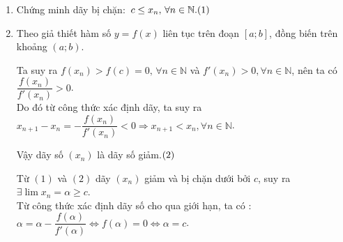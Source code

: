 \begin{enumerate}[1)]
\item Chứng minh dãy bị chặn$\colon$ $c\le x_n,\, \forall n\in\mathbb{N}.\hfill (1)$
\item Theo giả thiết hàm số $y=f(x)$ liên tục trên đoạn $[a;b]$, đồng biến trên khoảng $(a;b)$.

Ta suy ra $f(x_n) >f(c) =0,\, \forall n\in \mathbb{N}$ và $f'(x_n) >0, \forall n\in\mathbb{N}$, nên ta có $\dfrac{f(x_n)}{f'(x_n)}>0$.\\
Do đó từ công thức xác định dãy, ta suy ra $x_{n+1}-x_n =-\dfrac{f(x_n)}{f'(x_n)}<0\Rightarrow x_{n+1}<x_n,\forall n\in\mathbb{N}$.

Vậy dãy số $(x_n)$ là dãy số giảm.$\hfill (2)$

Từ $(1)$ và $(2)$ dãy $(x_n)$ giảm và bị chặn dưới bởi $c$, suy ra $\exists \displaystyle\lim x_n =\alpha \ge c$.\\
Từ công thức xác định dãy số cho qua giới hạn, ta có $\colon$
 $\alpha =\alpha -\dfrac{f(\alpha )}{f'(\alpha )}\Leftrightarrow f(\alpha )=0 \Leftrightarrow \alpha =c$.
\end{enumerate}

